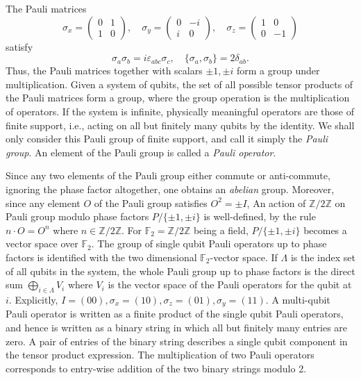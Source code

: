 \documentclass[letterpaper,12pt]{amsart}
\theoremstyle{definition} \newtheorem{defn}{Definition}
\theoremstyle{definition} \newtheorem{rem}{Remark}
\theoremstyle{definition} \newtheorem{example}{Example}
\newcommand{\FF}{\mathbb{F}}
\begin{document}
The Pauli matrices
\[
 \sigma_x = \begin{pmatrix} 0 & 1 \\ 1 & 0 \end{pmatrix}, \quad
 \sigma_y = \begin{pmatrix} 0 & -i \\ i & 0 \end{pmatrix}, \quad
 \sigma_z = \begin{pmatrix} 1 & 0 \\ 0 & -1 \end{pmatrix}
\]
satisfy
\[
 \sigma_a \sigma_b = i \varepsilon_{abc} \sigma_c, \quad
 \{ \sigma_a , \sigma_b \} = 2 \delta_{ab}.
\]
Thus, the Pauli matrices together with scalars $\pm 1, \pm i$
form a group under multiplication.
Given a system of qubits,
the set of all possible tensor products of the Pauli matrices form a group,
where the group operation is the multiplication of operators.
If the system is infinite, physically meaningful operators
are those of finite support, i.e.,
acting on all but finitely many qubits by the identity.
We shall only consider this Pauli group of finite support,
and call it simply the {\em Pauli group}.
An element of the Pauli group is called a {\em Pauli operator}.

Since any two elements of the Pauli group either commute or anti-commute,
ignoring the phase factor altogether, one obtains an {\em abelian} group.
Moreover, since any element $O$ of the Pauli group satisfies $O^2 = \pm I$,
An action of $\mathbb{Z}/2\mathbb{Z}$ on Pauli group modulo phase factors
$P / \{\pm 1, \pm i\}$ is well-defined,
by the rule $ n \cdot O = O^n$ where $n \in \mathbb{Z}/2\mathbb{Z}$.
For $\FF_2 = \mathbb{Z}/2\mathbb{Z}$ being a field,
$P / \{\pm 1, \pm i\}$ becomes a vector space over $\FF_2$.
The group of single qubit Pauli operators up to phase factors
is identified with the two dimensional $\FF_2$-vector space.
If $\Lambda$ is the index set of all qubits in the system,
the whole Pauli group up to phase factors is the direct sum $\bigoplus_{i \in \Lambda} V_i$
where $V_i$ is the vector space of the Pauli operators for the qubit at $i$.
Explicitly, $I = (00), \sigma_x = (10), \sigma_z = (01), \sigma_y = (11)$.
A multi-qubit Pauli operator
is written as a finite product of the single qubit Pauli operators,
and hence is written as a binary string in which all but finitely many entries are zero.
A pair of entries of the binary string describes a single qubit component in the tensor product expression.
The multiplication of two Pauli operators corresponds to entry-wise addition of the two binary strings modulo 2.
\end{document}
